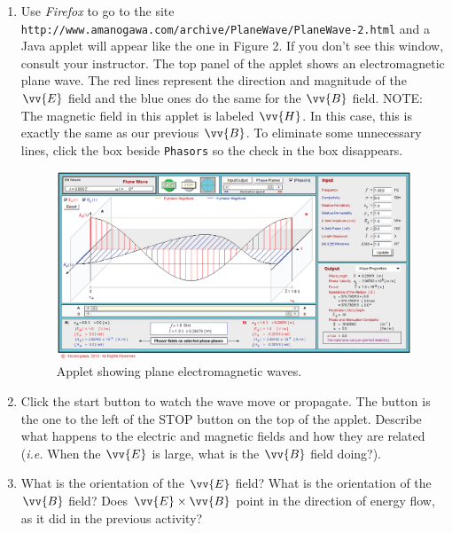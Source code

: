 \begin{enumerate}

\item  Use {\it Firefox} to go to the site
\verb!http://www.amanogawa.com/archive/PlaneWave/PlaneWave-2.html! and a Java applet will appear 
like the one in Figure 2. 
If you don't see this window, consult your instructor.
The top panel of the applet shows an electromagnetic plane wave.
The red lines represent the direction and magnitude of the $\vv {E}$ field and the
blue ones do the same for the $\vv {B}$ field.
NOTE: The magnetic field in this applet is labeled $\vv {H}$.
In this case, this is exactly the same as our previous $\vv {B}$.
To eliminate some unnecessary lines, click the box beside \texttt{Phasors} so the check in the box 
disappears.
\begin{figure}[hbt]
\begin{center}
\includegraphics[width=5.0in]{plane_waves/plane_wave_screenshot.eps}
\caption{Applet showing plane electromagnetic waves.}
\end{center}
\end{figure}
\vspace{-0.3in}

\pagebreak[2]
\item Click the start button to watch the wave move or propagate. The button is the one to the left of the STOP button on the top of the applet.
Describe what happens to the electric and magnetic fields and how they are related
({\it i.e.} When the $\vv {E}$ is large, what is the $\vv {B}$ field doing?).
\vspace{3.0cm}

\item What is the orientation of the $\vv {E}$ field?
What is the orientation of the $\vv {B}$ field?
Does $\vv {E} \times \vv {B}$ point in the direction of energy flow, as it did in the previous activity?
\vspace{2.0cm}


\end{enumerate}
